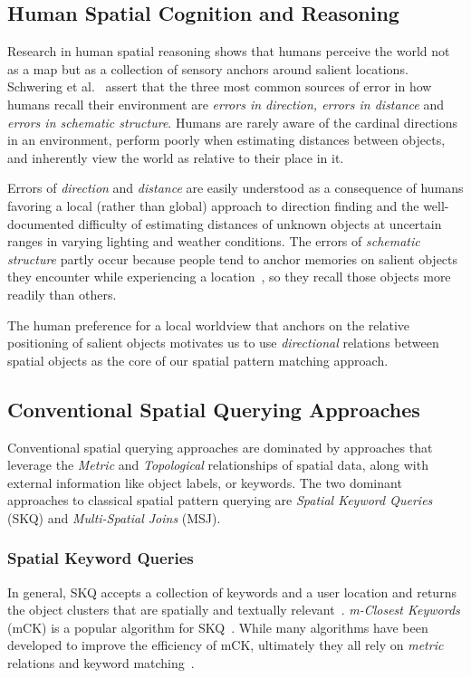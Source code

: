 \subsection{Human Spatial Cognition and Reasoning}
\par{
    Research in human spatial reasoning shows that humans perceive the world not as a map but as a collection of sensory anchors around salient locations. 
    Schwering et al.~\cite{Schwering2014} assert that the three most common sources of error in how humans recall their environment are \textit{errors in direction, errors in distance} and \textit{errors in schematic structure}.
    Humans are rarely aware of the cardinal directions in an environment, perform poorly when estimating distances between objects, and inherently view the world as relative to their place in it.
    }
\par{
    Errors of \textit{direction} and \textit{distance} are easily understood as a consequence of humans favoring a local (rather than global) approach to direction finding and the well-documented difficulty of estimating distances of unknown objects at uncertain ranges in varying lighting and weather conditions. 
    The errors of \textit{schematic structure} partly occur because people tend to anchor memories on salient objects they encounter while experiencing a location~\cite{Helbing2020}, so they recall those objects more readily than others.
}
\par{
    The human preference for a local worldview that anchors on the relative positioning of salient objects motivates us to use \textit{directional} relations between spatial objects as the core of our spatial pattern matching approach.
}

\subsection{Conventional Spatial Querying Approaches}

\par{
    Conventional spatial querying approaches are dominated by approaches that leverage the \textit{Metric} and \textit{Topological} relationships of spatial data, along with external information like object labels, or keywords. 
    The two dominant approaches to classical spatial pattern querying are \textit{Spatial Keyword Queries} (SKQ) and \textit{Multi-Spatial Joins} (MSJ).} 
\subsubsection{Spatial Keyword Queries}
\par{
    In general, SKQ accepts a collection of keywords and a user location and returns the object clusters that are spatially and textually relevant~\cite{Cao2012}.
    \textit{m-Closest Keywords} (mCK) is a popular algorithm for SKQ~\cite{Zhang2009}.
    While many algorithms have been developed to improve the efficiency of mCK, ultimately they all rely on \textit{metric} relations and keyword matching~\cite{Guo2015}. 
    }
